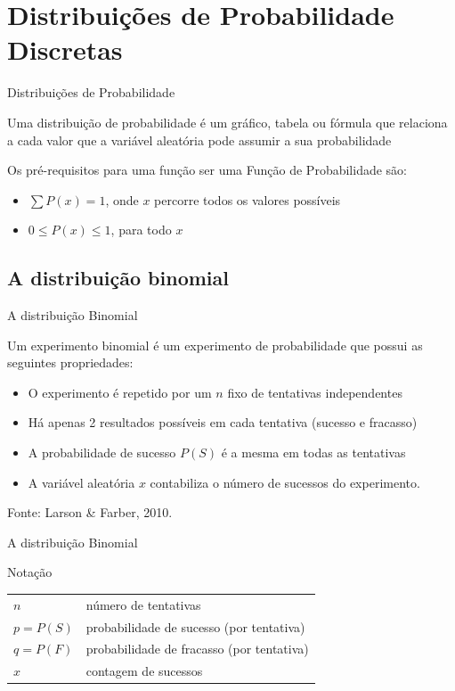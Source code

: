 \documentclass{beamer}
\begin{document}
\section[Distribuições Discretas]{Distribuições de Probabilidade Discretas}
\begin{frame}{Distribuições de Probabilidade}
  \begin{definition}
    Uma \alert{distribuição de probabilidade} é um gráfico, tabela ou
    fórmula que relaciona a cada valor que a variável aleatória pode
    assumir a sua probabilidade
  \end{definition}
  Os pré-requisitos para uma função ser uma Função de Probabilidade
  são:
  \begin{itemize}
  \item $\sum P(x) = 1$, onde $x$ percorre todos os valores possíveis
  \item $0 \le P(x) \le 1$, para todo $x$
  \end{itemize}
\end{frame}

\subsection{A distribuição binomial}

\begin{frame}{A distribuição Binomial}
  \begin{definition}
    Um \alert{experimento binomial} é um experimento de probabilidade que possui as seguintes propriedades:

    \begin{itemize}
    \item O experimento é repetido por um $n$ fixo de tentativas independentes
    \item Há apenas 2 resultados possíveis em cada tentativa (sucesso e fracasso)
    \item A probabilidade de sucesso $P(S)$ é a mesma em todas as tentativas
    \item A variável aleatória $x$ contabiliza o número de sucessos do experimento.
    \end{itemize}
  \end{definition}

Fonte: Larson \& Farber, 2010.
\end{frame}

\begin{frame}{A distribuição Binomial}
  \begin{block}{Notação}
    \begin{tabular}{ll}
      $n$& número de tentativas \\
$p = P(S)$ & probabilidade de sucesso (por tentativa)\\
$q = P(F)$ & probabilidade de fracasso (por tentativa)\\
$x$ & contagem de sucessos\\
    \end{tabular}
  \end{block}
\end{frame}
\end{document}
